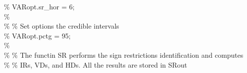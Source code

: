 \hspace{1mm}\hspace{5mm} \hspace{5mm} \hspace{5mm} \hspace{5mm} \hspace{5mm} \textcolor{matlabgreen}{\% VARopt.sr\_hor = 6; }\\ 
\hspace{1mm}\hspace{5mm} \hspace{5mm} \hspace{5mm} \hspace{5mm} \hspace{5mm} \textcolor{matlabgreen}{\%  }\\ 
\hspace{1mm}\hspace{5mm} \hspace{5mm} \hspace{5mm} \hspace{5mm} \hspace{5mm} \textcolor{matlabgreen}{\% }\textcolor{matlabgreen}{\% Set options the credible intervals }\\ 
\hspace{1mm}\hspace{5mm} \hspace{5mm} \hspace{5mm} \hspace{5mm} \hspace{5mm} \textcolor{matlabgreen}{\% VARopt.pctg = 95; }\\ 
\hspace{1mm}\hspace{5mm} \hspace{5mm} \hspace{5mm} \hspace{5mm} \hspace{5mm} \textcolor{matlabgreen}{\%  }\\ 
\hspace{1mm}\hspace{5mm} \hspace{5mm} \hspace{5mm} \hspace{5mm} \hspace{5mm} \textcolor{matlabgreen}{\% }\textcolor{matlabgreen}{\% The functin SR performs the sign restrictions identification and computes }\\ 
\hspace{1mm}\hspace{5mm} \hspace{5mm} \hspace{5mm} \hspace{5mm} \hspace{5mm} \textcolor{matlabgreen}{\% }\textcolor{matlabgreen}{\% IRs, VDs, and HDs. All the results are stored in SRout }\\ 
